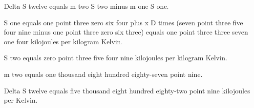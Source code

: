 Delta S twelve equals m two S two minus m one S one.

S one equals one point three zero six four plus x D times (seven point three five four nine minus one point three zero six three) equals one point three three seven one four kilojoules per kilogram Kelvin.

S two equals zero point three five four nine kilojoules per kilogram Kelvin.

m two equals one thousand eight hundred eighty-seven point nine.

Delta S twelve equals five thousand eight hundred eighty-two point nine kilojoules per Kelvin.